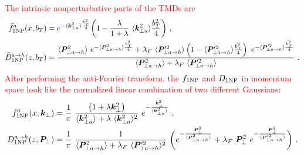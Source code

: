 \documentclass[aps,preprintnumbers,showpacs,nofootinbib,superscriptaddress,floatfix]{revtex4}
\newcommand{\T}{\perp}
\begin{document}
\textcolor{red}{The intrinsic nonperturbative parts of the TMDs are}
\begin{align}
\widetilde{f}_{1 {\rm NP}}^a (x, b_T) &= e^{-\langle \bm{k}_{\T a}^2 \rangle \frac{b_T^2}{4}}
        \bigg( 1 - \frac{\lambda}{1+\lambda} \  \langle \bm{k}_{\T a}^2 \rangle \frac{b_T^2}{4} \bigg)\  ,
\label{e:f1NP} \\
\widetilde{D}_{1 {\rm NP}}^{a \to h} (z, b_T) &= 
    \frac{ \langle \bm{P}_{\T a\to h}^2 \rangle \   e^{-\langle \bm{P}_{\T a\to h}^2 \rangle \frac{b_T^2}{4}}
        + \lambda_F \   \langle \bm{P}_{\T a\to h}'^2 \rangle \left( 1 - \langle \bm{P}_{\T a\to h}'^2 \rangle \frac{b_T^2}{4} \right)
         \  e^{- \langle \bm{P}_{\T a\to h}'^2 \rangle \frac{b_T^2}{4}}}
     {\langle \bm{P}_{\T a\to h}^2 \rangle + \lambda_F\   \langle \bm{P}_{\T a\to h}'^2 \rangle} \  .
\label{e:D1NP}
\end{align} 
\textcolor{red}{After performing the anti-Fourier transform, the $f_{1 \rm NP}$ and $D_{1\rm NP}$ in momentum space look like the normalized linear combination of two different Gaussians:}
\begin{align} 
f_{1 {\rm NP}}^a (x, \bm{k}_{\T}) &= \frac{1}{\pi} \  
                        \frac{\big( 1 +\lambda \bm{k}_{\T}^2\big)}
                                {\langle \bm{k}_{\T a}^2 \rangle +\lambda \  \langle \bm{k}_{\T a}^2 \rangle^2}
                        \  e^{- \frac{\bm{k}_{\T}^2}{\langle \bm{k}_{\T a}^2 \rangle}} \  ,
\label{e:f1NPk}   \\
D_{1 {\rm NP}}^{a\to h} (z, \bm{P}_{\T}) &=  \frac{1}{\pi} \   
                       \frac{1}{\langle \bm{P}_{\T a\to h}^2 \rangle + \lambda_F \  \langle \bm{P}_{\T a\to h}'^2 \rangle^2}
                \   \bigg( e^{- \frac{\bm{P}_{\T}^2}{\langle \bm{P}_{\T a\to h}^2 \rangle}}
                              + \lambda_F \  \bm{P}_{\T}^2 \  e^{- \frac{\bm{P}_{\T}^2}{\langle \bm{P}_{\T a\to h}'^2 \rangle}} \bigg) \  .
\label{e:D1NPk}
\end{align} 
\end{document}
